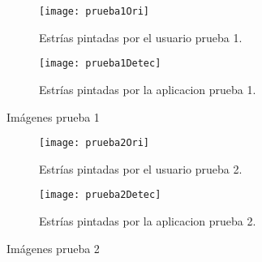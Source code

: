\begin{table}[]
\centering
\caption{Resultados medidas de calidad}
\label{tab:parte}
\end{table}



\begin{figure}
	\begin{subfigure}[c]{.5\linewidth}
	\centering\large \texttt{[image: prueba1Ori]}
	\caption{Estrías pintadas por el usuario prueba 1.}\label{fig:orip1}
	\end{subfigure}%
	\begin{subfigure}[c]{.5\linewidth}
	\centering\large \texttt{[image: prueba1Detec]}
	\caption{Estrías pintadas por la aplicacion prueba 1.}\label{fig:calcp1}
	\end{subfigure}%
	\caption{Imágenes prueba 1}
	\label{fig:p1}
\end{figure}



\begin{figure}
	\begin{subfigure}[c]{.5\linewidth}
	\centering\large \texttt{[image: prueba2Ori]}
	\caption{Estrías pintadas por el usuario prueba 2.}\label{fig:orip2}
	\end{subfigure}%
	\begin{subfigure}[c]{.5\linewidth}
	\centering\large \texttt{[image: prueba2Detec]}
	\caption{Estrías pintadas por la aplicacion prueba 2.}\label{fig:calcp2}
	\end{subfigure}%
	\caption{Imágenes prueba 2}
	\label{fig:p2}

\end{figure}


